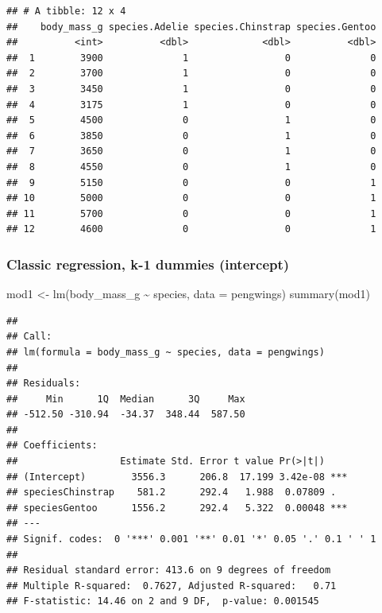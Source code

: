 \documentclass[
]{book}
\newenvironment{Shaded}{\begin{snugshade}}{\end{snugshade}}
\newcommand{\AttributeTok}[1]{\textcolor[rgb]{0.77,0.63,0.00}{#1}}
\newcommand{\FunctionTok}[1]{\textcolor[rgb]{0.00,0.00,0.00}{#1}}
\newcommand{\NormalTok}[1]{#1}
\newcommand{\OtherTok}[1]{\textcolor[rgb]{0.56,0.35,0.01}{#1}}
\newcommand{\SpecialCharTok}[1]{\textcolor[rgb]{0.00,0.00,0.00}{#1}}
\begin{document}
\begin{verbatim}
## # A tibble: 12 x 4
##    body_mass_g species.Adelie species.Chinstrap species.Gentoo
##          <int>          <dbl>             <dbl>          <dbl>
##  1        3900              1                 0              0
##  2        3700              1                 0              0
##  3        3450              1                 0              0
##  4        3175              1                 0              0
##  5        4500              0                 1              0
##  6        3850              0                 1              0
##  7        3650              0                 1              0
##  8        4550              0                 1              0
##  9        5150              0                 0              1
## 10        5000              0                 0              1
## 11        5700              0                 0              1
## 12        4600              0                 0              1
\end{verbatim}

\hypertarget{classic-regression-k-1-dummies-intercept}{%
\subsubsection{Classic regression, k-1 dummies (intercept)}\label{classic-regression-k-1-dummies-intercept}}

\begin{Shaded}
\begin{Highlighting}[]
\NormalTok{mod1 }\OtherTok{\textless{}{-}} \FunctionTok{lm}\NormalTok{(body\_mass\_g }\SpecialCharTok{\textasciitilde{}}\NormalTok{ species, }\AttributeTok{data =}\NormalTok{ pengwings)}
\FunctionTok{summary}\NormalTok{(mod1)}
\end{Highlighting}
\end{Shaded}

\begin{verbatim}
## 
## Call:
## lm(formula = body_mass_g ~ species, data = pengwings)
## 
## Residuals:
##     Min      1Q  Median      3Q     Max 
## -512.50 -310.94  -34.37  348.44  587.50 
## 
## Coefficients:
##                  Estimate Std. Error t value Pr(>|t|)    
## (Intercept)        3556.3      206.8  17.199 3.42e-08 ***
## speciesChinstrap    581.2      292.4   1.988  0.07809 .  
## speciesGentoo      1556.2      292.4   5.322  0.00048 ***
## ---
## Signif. codes:  0 '***' 0.001 '**' 0.01 '*' 0.05 '.' 0.1 ' ' 1
## 
## Residual standard error: 413.6 on 9 degrees of freedom
## Multiple R-squared:  0.7627, Adjusted R-squared:   0.71 
## F-statistic: 14.46 on 2 and 9 DF,  p-value: 0.001545
\end{verbatim}
\end{document}
